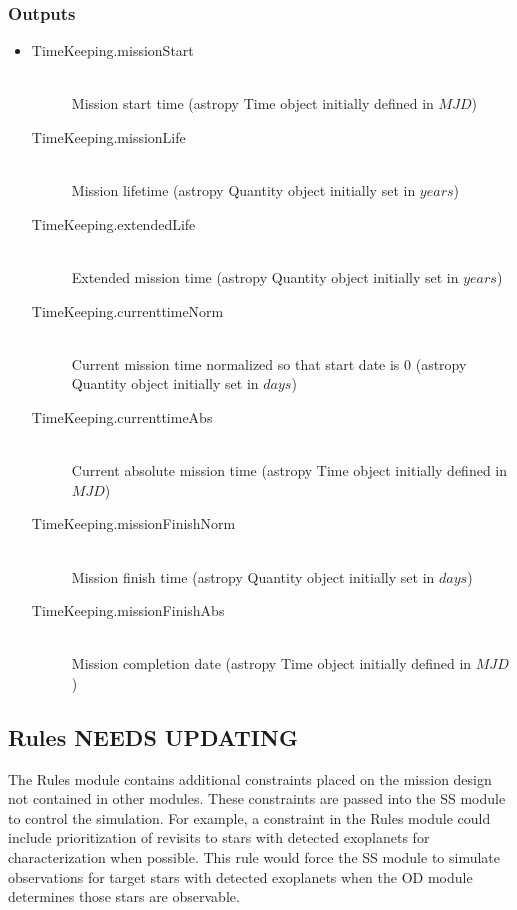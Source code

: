 \documentclass[cleanfoot]{asme2ej}
\begin{document}
\subsubsection*{Outputs}
\begin{itemize}
    \item
    \begin{description}
        \item[TimeKeeping.missionStart] \hfill \\
        Mission start time (astropy Time object initially defined in $ MJD $)
        \item[TimeKeeping.missionLife] \hfill \\
        Mission lifetime (astropy Quantity object initially set in $ years $)
        \item[TimeKeeping.extendedLife] \hfill \\
        Extended mission time (astropy Quantity object initially set in $ years $)
        \item[TimeKeeping.currenttimeNorm] \hfill \\
        Current mission time normalized so that start date is 0 (astropy Quantity object initially set in $ days $)
        \item[TimeKeeping.currenttimeAbs] \label{sec:currenttime}\hfill \\
        Current absolute mission time (astropy Time object initially defined in $ MJD $)
        \item[TimeKeeping.missionFinishNorm] \hfill \\
        Mission finish time (astropy Quantity object initially set in $ days $)
        \item[TimeKeeping.missionFinishAbs] \hfill \\
        Mission completion date (astropy Time object initially defined in $ MJD $)

    \end{description}
\end{itemize}


\subsection{Rules NEEDS UPDATING}
The Rules module contains additional constraints placed on the mission design not contained in other modules. These constraints are passed into the SS module to control the simulation. For example, a constraint in the Rules module could include prioritization of revisits to stars with detected exoplanets for characterization when possible. This rule would force the SS module to simulate observations for target stars with detected exoplanets when the OD module determines those stars are observable.
\end{document}
